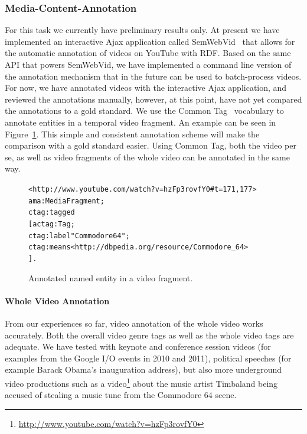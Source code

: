 \documentclass[runningheads,a4paper]{llncs}
\newenvironment{code}[1]
{\begin{lrbox}{\inverbatim}\begin{minipage}{12cm}\begin{alltt}{#1}}
{\end{alltt}\end{minipage}\end{lrbox}\colorbox{lightgray}{\usebox{\inverbatim}}}
\begin{document}
\subsubsection{Media-Content-Annotation}
For this task we currently have preliminary results only. At present we have implemented an interactive Ajax application called SemWebVid~\cite{semwebvid} that allows for the automatic annotation of videos on YouTube with RDF. Based on the same API that powers SemWebVid, we have implemented a command line version of the annotation mechanism that in the future can be used to batch-process videos. For now, we have annotated videos with the interactive Ajax application, and reviewed the annotations manually, however, at this point, have not yet compared the annotations to a gold standard. We use the Common Tag~\cite{CommonTag:Spec} vocabulary to annotate entities in a temporal video fragment. An example can be seen in Figure~\ref{code:ctag}. This simple and consistent annotation scheme will make the comparison with a gold standard easier. Using Common Tag, both the video per se, as well as video fragments of the whole video can be annotated in the same way.

\begin{figure}[htbp!]
\begin{center}
{\footnotesize
\begin{code}
<http://www. youtube.com/watch?v=hzFp3rovfY0#t=171,177>
  a ma:MediaFragment ;
  ctag:tagged
    [ a ctag:Tag ;
      ctag:label "Commodore 64" ;
      ctag:means <http://dbpedia.org/resource/Commodore_64>
    ] .
\end{code}}
  \caption[Annotated named entity in a video fragment.]{Annotated named entity in a video fragment.}
  \label{code:ctag} 
  \end{center}  
\end{figure}

\paragraph{Whole Video Annotation}
From our experiences so far, video annotation of the whole video works accurately. Both the overall video genre tags as well as the whole video tags are adequate. We have tested with keynote and conference session videos (for examples from the Google I/O events in 2010 and 2011), political speeches (for example Barack Obama's inauguration address), but also more underground video productions such as a video\footnote{\url{http://www.youtube.com/watch?v=hzFp3rovfY0}} about the music artist Timbaland being accused of stealing a music tune from the Commodore 64 scene.
\end{document}
